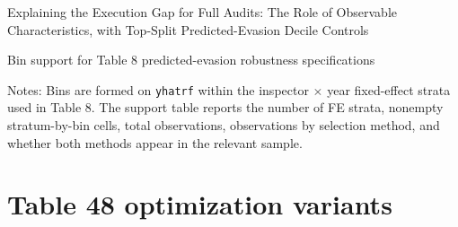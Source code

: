 \documentclass{article}
\newcommand{\OutPath}{Output/}%
\newcommand{\OutPath}{../Output/}%
\begin{document}
\begin{table}[H]\centering
\begin{adjustbox}{max width=\textwidth}
\begin{threeparttable}
\caption{Explaining the Execution Gap for Full Audits: The Role of Observable Characteristics, with Top-Split Predicted-Evasion Decile Controls}
\label{tab:table8_fullaudits_yhatrf_topsplit_control}

\footnotesize


\begin{tablenotes}[flushleft]
\end{tablenotes}
\end{threeparttable}
\end{adjustbox}
\end{table}

\begin{table}[H]\centering
\begin{adjustbox}{max width=\textwidth, max totalheight=0.82\textheight}
\begin{threeparttable}
\caption{Bin support for Table 8 predicted-evasion robustness specifications}
\label{tab:table8_fullaudits_yhatrf_bin_support}

\scriptsize


\begin{tablenotes}[flushleft]
\scriptsize
\item Notes: Bins are formed on \texttt{yhatrf} within the inspector $\times$ year fixed-effect strata used in Table 8. The support table reports the number of FE strata, nonempty stratum-by-bin cells, total observations, observations by selection method, and whether both methods appear in the relevant sample.
\end{tablenotes}
\end{threeparttable}
\end{adjustbox}
\end{table}

\section{Table 48 optimization variants}
\end{document}
